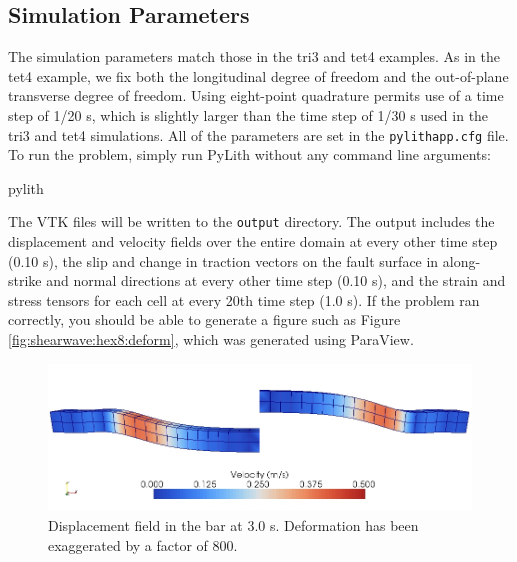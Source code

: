 \subsection{Simulation Parameters}

The simulation parameters match those in the tri3 and tet4 examples.
As in the tet4 example, we fix both the longitudinal degree of freedom
and the out-of-plane transverse degree of freedom. Using eight-point
quadrature permits use of a time step of 1/20 s, which is slightly
larger than the time step of 1/30 s used in the tri3 and tet4 simulations.
All of the parameters are set in the \texttt{pylithapp.cfg} file.
To run the problem, simply run PyLith without any command line arguments:
\begin{lyxcode}
pylith
\end{lyxcode}
The VTK files will be written to the \texttt{output} directory. The
output includes the displacement and velocity fields over the entire
domain at every other time step (0.10 s), the slip and change in traction
vectors on the fault surface in along-strike and normal directions
at every other time step (0.10 s), and the strain and stress tensors
for each cell at every 20th time step (1.0 s). If the problem ran
correctly, you should be able to generate a figure such as Figure
\vref{fig:shearwave:hex8:deform}, which was generated using ParaView.

\noindent \begin{center}
\begin{figure}
\begin{centering}
\includegraphics[scale=0.5]{tutorials/shearwave/figs/hex8deform30}
\par\end{centering}

\caption{Displacement field in the bar at 3.0 s. Deformation has been exaggerated
by a factor of 800.\label{fig:shearwave:hex8:deform}}
\end{figure}

\par\end{center}

